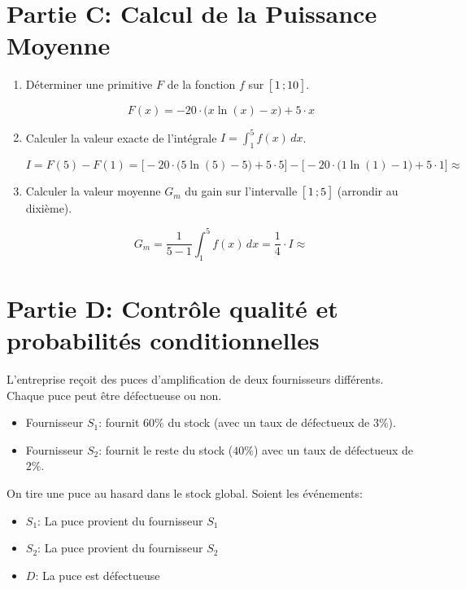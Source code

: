 \documentclass[11pt, a4paper]{report}
\begin{document}
\section*{Partie C\@: Calcul de la Puissance Moyenne}

\begin{enumerate}[resume]
    \item Déterminer une primitive $F$ de la fonction $f$ sur $\bigl[ \, 1 \, ; 10 \,\bigl]$.
    \begin{blocvisible}[height=1.5]
\[F(x) = -20 \cdot \Big(x \ln(x) - x\Big) + 5 \cdot x\]
    \end{blocvisible}
    \item Calculer la valeur exacte de l'intégrale $I = \displaystyle\int_{1}^{5} f(x) \, dx$.
    \begin{blocvisible}[height=1.5]    
\[I = F(5) - F(1) = \Big[-20 \cdot \Big(5 \ln(5) - 5\Big) + 5 \cdot 5\Big] - \Big[-20 \cdot \Big(1 \ln(1) - 1\Big) + 5 \cdot 1\Big]  \approx  \]
    \end{blocvisible}
    \item Calculer la valeur moyenne $G_m$ du gain sur l'intervalle $\bigl[ \, 1 \, ; 5 \,\bigl]$ (arrondir au dixième).
    \begin{blocvisible}[height=1.5]
\[G_m = \frac{1}{5-1} \int_{1}^{5} f(x) \, dx = \frac{1}{4} \cdot I \approx \]
    \end{blocvisible}
\end{enumerate}

\section*{Partie D\@: Contrôle qualité et probabilités conditionnelles}

L'entreprise reçoit des puces d'amplification de deux fournisseurs différents. Chaque puce peut être défectueuse ou non.

\begin{itemize}
    \item Fournisseur $S_1$\@: fournit $60 \%$ du stock (avec un taux de défectueux de $3 \%$).
    \item Fournisseur $S_2$\@: fournit le reste du stock ($40 \%$) avec un taux de défectueux de $2 \%$.
\end{itemize}

On tire une puce au hasard dans le stock global. Soient les événements:

\begin{itemize}
    \item $S_1$: \og{}La puce provient du fournisseur $S_1$\fg{}
    \item $S_2$: \og{}La puce provient du fournisseur $S_2$\fg{}
    \item $D$: \og{}La puce est défectueuse\fg{}
\end{itemize}
\end{document}
